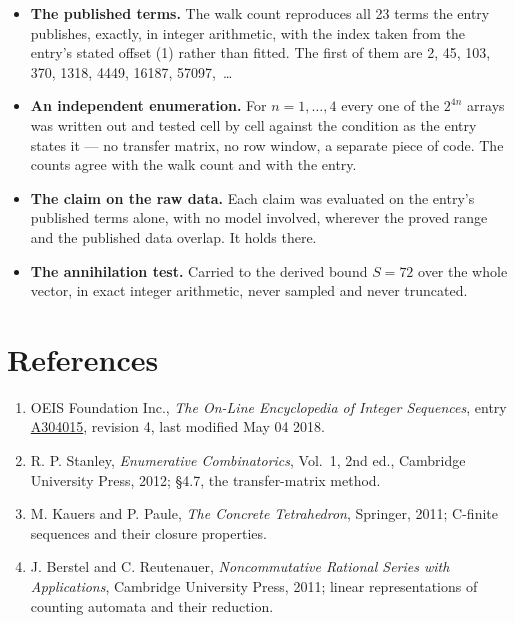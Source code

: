 \documentclass[11pt]{article}
\theoremstyle{definition}
\begin{document}
\begin{itemize}

\item {\bfseries The published terms.} The walk count reproduces all 23 terms the entry publishes, exactly, in integer arithmetic, with the index taken from the entry's stated offset (1) rather than fitted. The first of them are 2, 45, 103, 370, 1318, 4449, 16187, 57097,~\dots

\item {\bfseries An independent enumeration.} For $n = 1,\dots,4$ every one of the $2^{4n}$ arrays was written out and tested cell by cell against the condition as the entry states it --- no transfer matrix, no row window, a separate piece of code. The counts agree with the walk count and with the entry.

\item {\bfseries The claim on the raw data.} Each claim was evaluated on the entry's published terms alone, with no model involved, wherever the proved range and the published data overlap. It holds there.

\item {\bfseries The annihilation test.} Carried to the derived bound $S = 72$ over the whole vector, in exact integer arithmetic, never sampled and never truncated.

\end{itemize}

\section{References}

\begin{enumerate}

\item OEIS Foundation Inc., \emph{The On-Line Encyclopedia of Integer Sequences}, entry \href{https://oeis.org/A304015}{A304015}, revision 4, last modified May 04 2018.

\item R. P. Stanley, \emph{Enumerative Combinatorics}, Vol.~1, 2nd ed., Cambridge University Press, 2012; \S4.7, the transfer-matrix method.

\item M. Kauers and P. Paule, \emph{The Concrete Tetrahedron}, Springer, 2011; C-finite sequences and their closure properties.

\item J. Berstel and C. Reutenauer, \emph{Noncommutative Rational Series with Applications}, Cambridge University Press, 2011; linear representations of counting automata and their reduction.

\end{enumerate}
\end{document}
